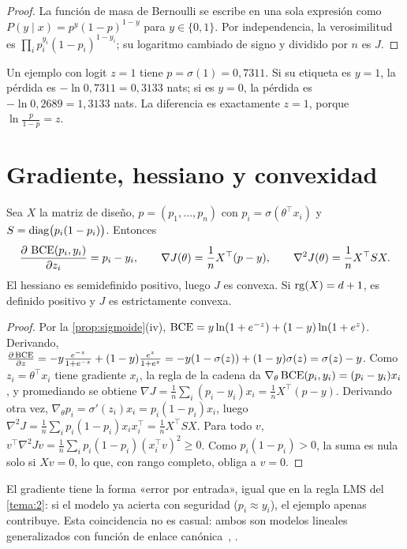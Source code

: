 \begin{proof}
La función de masa de Bernoulli se escribe en una sola expresión como $P(y\mid x)=p^{y}(1-p)^{1-y}$ para $y\in\{0,1\}$. Por independencia, la verosimilitud es $\prod_i p_i^{y_i}(1-p_i)^{1-y_i}$; su logaritmo cambiado de signo y dividido por $n$ es $J$.
\end{proof}

\begin{ejemplo}\label{ej:logistica}
Un ejemplo con logit $z=1$ tiene $p=\sigma(1)=0{,}7311$. Si su etiqueta es $y=1$, la pérdida es $-\ln 0{,}7311=0{,}3133$ nats; si es $y=0$, la pérdida es $-\ln 0{,}2689=1{,}3133$ nats. La diferencia es exactamente $z=1$, porque $\ln\frac{p}{1-p}=z$.
\end{ejemplo}

\section{Gradiente, hessiano y convexidad}

\begin{teorema}\label{teo:grad-logistica}
Sea $X$ la matriz de diseño, $p=(p_1,\dots,p_n)$ con $p_i=\sigma(\theta^{\top}x_i)$ y $S=\operatorname{diag}\bigl(p_i(1-p_i)\bigr)$. Entonces
\[
\frac{\partial\,\operatorname{BCE}(p_i,y_i)}{\partial z_i}=p_i-y_i,\qquad
\nabla J(\theta)=\frac{1}{n}X^{\top}(p-y),\qquad
\nabla^{2}J(\theta)=\frac{1}{n}X^{\top}SX.
\]
El hessiano es semidefinido positivo, luego $J$ es convexa. Si $\operatorname{rg}(X)=d+1$, es definido positivo y $J$ es estrictamente convexa.
\end{teorema}

\begin{proof}
Por la \cref{prop:sigmoide}(iv), $\operatorname{BCE}=y\ln(1+e^{-z})+(1-y)\ln(1+e^{z})$. Derivando, $\frac{\partial\operatorname{BCE}}{\partial z}=-y\frac{e^{-z}}{1+e^{-z}}+(1-y)\frac{e^{z}}{1+e^{z}}=-y(1-\sigma(z))+(1-y)\sigma(z)=\sigma(z)-y$. Como $z_i=\theta^{\top}x_i$ tiene gradiente $x_i$, la regla de la cadena da $\nabla_\theta\operatorname{BCE}(p_i,y_i)=(p_i-y_i)x_i$, y promediando se obtiene $\nabla J=\frac1n\sum_i(p_i-y_i)x_i=\frac1nX^{\top}(p-y)$. Derivando otra vez, $\nabla_\theta p_i=\sigma'(z_i)x_i=p_i(1-p_i)x_i$, luego $\nabla^{2}J=\frac1n\sum_i p_i(1-p_i)x_ix_i^{\top}=\frac1nX^{\top}SX$. Para todo $v$, $v^{\top}\nabla^{2}Jv=\frac1n\sum_ip_i(1-p_i)(x_i^{\top}v)^{2}\ge 0$. Como $p_i(1-p_i)>0$, la suma es nula solo si $Xv=0$, lo que, con rango completo, obliga a $v=0$.
\end{proof}

El gradiente tiene la forma «error por entrada», igual que en la regla LMS del \cref{tema:2}: si el modelo ya acierta con seguridad ($p_i\approx y_i$), el ejemplo apenas contribuye. Esta coincidencia no es casual: ambos son modelos lineales generalizados con función de enlace canónica~\cite[cap.~3]{cs229}, \cite[§4.3.6]{bishop}.

